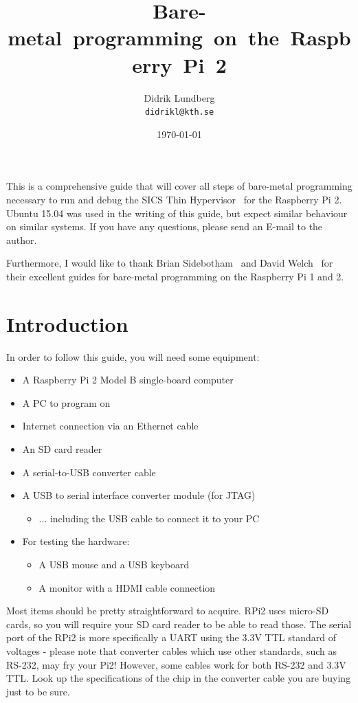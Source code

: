\documentclass[a4paper,11pt,reqno]{amsart}
\title{\mbox{Bare-metal programming on the Raspberry Pi 2}}
\author{Didrik Lundberg\\
\texttt{didrikl@kth.se}}
\date{\today}
\begin{document}
\maketitle
\noindent
This is a comprehensive guide that will cover all steps of bare-metal programming necessary to run and debug the SICS Thin Hypervisor~\cite{do14sth} for the Raspberry Pi 2. Ubuntu 15.04 was used in the writing of this guide, but expect similar behaviour on similar systems. If you have any questions, please send an E-mail to the author.

Furthermore, I would like to thank Brian Sidebotham~\cite{sidebotham14guide} and David Welch~\cite{welch14guide} for their excellent guides for bare-metal programming on the Raspberry Pi 1 and 2.
\section{Introduction}
In order to follow this guide, you will need some equipment:
\begin{itemize}
  \item A Raspberry Pi 2 Model B single-board computer
  \item A PC to program on
  \item Internet connection via an Ethernet cable
  \item An SD card reader
  \item A serial-to-USB converter cable
  \item A USB to serial interface converter module (for JTAG)
   \begin{itemize}
    \item ... including the USB cable to connect it to your PC
  \end{itemize}
  \item For testing the hardware:
  \begin{itemize}
    \item A USB mouse and a USB keyboard
    \item A monitor with a HDMI cable connection
  \end{itemize}
\end{itemize}
Most items should be pretty straightforward to acquire. RPi2 uses micro-SD cards, so you will require your SD card reader to be able to read those. The serial port of the RPi2 is more specifically a UART using the 3.3V TTL standard of voltages - please note that converter cables which use other standards, such as RS-232, may fry your Pi2! However, some cables work for both RS-232 and 3.3V TTL. Look up the specifications of the chip in the converter cable you are buying just to be sure.
\end{document}
